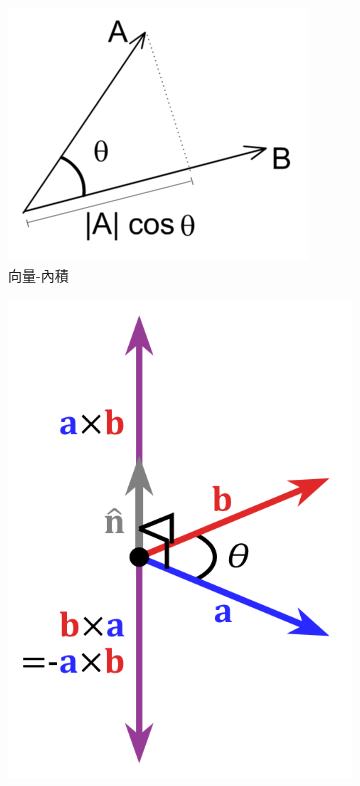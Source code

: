 \begin{figure}[h]
    \begin{subfigure}[b]{0.24\linewidth}
    \includegraphics[width=\linewidth]{./resources/physics/intersect.png}
    \caption{向量-內積}
    \end{subfigure}
    \begin{subfigure}[b]{0.24\linewidth}
    \includegraphics[width=\linewidth]{./resources/physics/outersect.png}

\end{subfigure}
\end{figure}
